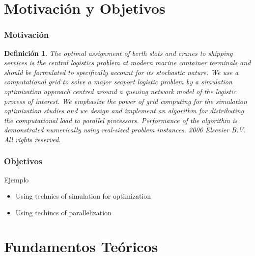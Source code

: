\documentclass{beamer}
\newtheorem{definicion}{Definición}
\begin{document}
\section{Motivación y Objetivos}


\begin{frame}

\frametitle{Motivación}

\begin{definicion}
The optimal assignment of berth slots and cranes to shipping services is the central logistics problem at modern marine
container terminals and should be formulated to specifically account for its stochastic nature. We use a computational grid
to solve a major seaport logistic problem by a simulation optimization approach centred around a queuing network model
of the logistic process of interest. We emphasize the power of grid computing for the simulation optimization studies and
we design and implement an algorithm for distributing the computational load to parallel processors. Performance of the
algorithm is demonstrated numerically using real-sized problem instances.
 2006 Elsevier B.V. All rights reserved.
\end{definicion}

\end{frame}

\begin{frame}

\frametitle{Objetivos }

\begin{block}{Ejemplo}
  \begin{itemize}
  \item
   Using technics of simulation for optimization
  \pause

  \item
   Using techincs of parallelization 

  \end{itemize}
\end{block}

\end{frame}

\section{Fundamentos Teóricos}
\end{document}
